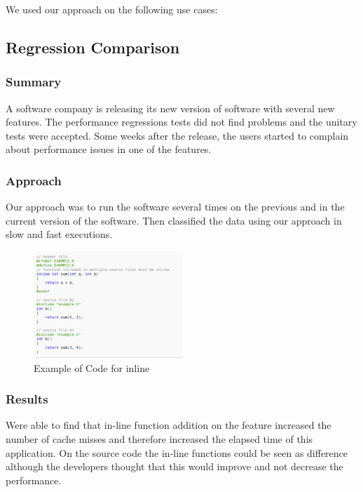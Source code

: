 We used our approach on the following use cases:

\subsection{\textbf{Regression Comparison}}
    
\subsubsection{Summary}
    A software company is releasing its new version of software with several new features. The performance regressions tests did not find problems and the unitary tests were accepted. Some weeks after the release, the users started to complain about performance issues in one of the features.
    
\subsubsection{Approach}
    Our approach was to run the software several times on the previous and in the current version of the software. Then classified the data using our approach in slow and fast executions. 
    
    \begin{figure}[h]
      \centering
        \includegraphics[width=0.50\textwidth]{figures/inline_example.png}
        \caption{Example of Code for inline}
        \label{fig:caseOpt}
    \end{figure}

\subsubsection{Results}
    Were able to find that in-line function addition on the feature increased the number of cache misses and therefore increased the elapsed time of this application. On the source code the in-line functions could be seen as difference although the developers thought that this would improve and not decrease the performance.
    
